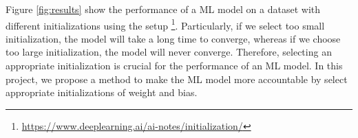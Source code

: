 Figure \ref{fig:results} show the performance of a ML model on a dataset with different initializations using the setup \footnote{\small \url{https://www.deeplearning.ai/ai-notes/initialization/}}. Particularly, if we select too small initialization, the model will take a long time to converge, whereas if we choose too large initialization, the model will never converge. Therefore, selecting an appropriate initialization is crucial for the performance of an ML model. In this project, we propose a method to make the ML model more accountable by select appropriate initializations of weight and bias. 
%
%
%
%
%
